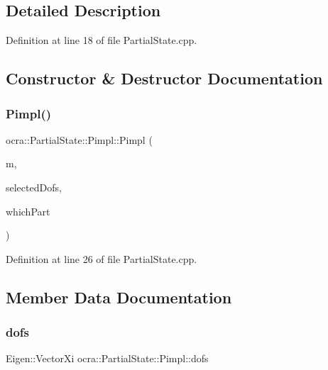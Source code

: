 \subsection{Detailed Description}


Definition at line 18 of file Partial\+State.\+cpp.



\subsection{Constructor \& Destructor Documentation}
\hypertarget{structocra_1_1PartialState_1_1Pimpl_a4f12abe2e984af1d293d847dc3456724}{}\label{structocra_1_1PartialState_1_1Pimpl_a4f12abe2e984af1d293d847dc3456724} 
\subsubsection{\texorpdfstring{Pimpl()}{Pimpl()}}
{\footnotesize\ttfamily ocra\+::\+Partial\+State\+::\+Pimpl\+::\+Pimpl (\begin{DoxyParamCaption}\item[{const \hyperlink{classocra_1_1Model}{Model} \&}]{m,  }\item[{const Eigen\+::\+Vector\+Xi \&}]{selected\+Dofs,  }\item[{int}]{which\+Part }\end{DoxyParamCaption})\hspace{0.3cm}{\ttfamily [inline]}}



Definition at line 26 of file Partial\+State.\+cpp.



\subsection{Member Data Documentation}
\hypertarget{structocra_1_1PartialState_1_1Pimpl_a206c2d1097d24706e5bf2d3a9b0862a8}{}\label{structocra_1_1PartialState_1_1Pimpl_a206c2d1097d24706e5bf2d3a9b0862a8} 
\subsubsection{\texorpdfstring{dofs}{dofs}}
{\footnotesize\ttfamily Eigen\+::\+Vector\+Xi ocra\+::\+Partial\+State\+::\+Pimpl\+::dofs}



